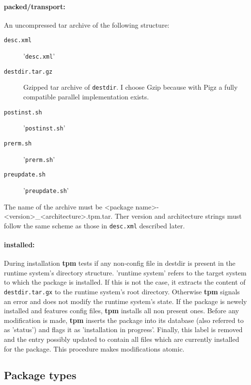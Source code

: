\documentclass[a4paper]{article}
\newcommand{\file}[1]{\texttt{#1}}
\newcommand{\program}[1]{\textbf{#1}}
\begin{document}
	\paragraph{packed/transport:}
	An uncompressed tar archive of the following structure:
	\begin{description}
		\item[\file{desc.xml}] '\file{desc.xml}'
		
		\item[\file{destdir.tar.gz}] Gzipped tar archive of \file{destdir}. I choose Gzip because with Pigz a fully compatible parallel implementation exists.
		
		\item[\file{postinst.sh}] '\file{postinst.sh}'
		
		\item[\file{prerm.sh}] '\file{prerm.sh}'
		
		\item[\file{preupdate.sh}] '\file{preupdate.sh}'
	\end{description}
	
	\noindent
	The name of the archive must be <package name>-<version>\_<architecture>.tpm.tar. Ther version and architecture strings must follow the same scheme as those in \file{desc.xml} described later.
	
	\paragraph{installed:}
	During installation \program{tpm} tests if any non-config file in destdir is present in the runtime system's directory structure. 'runtime system' refers to the target system to which the package is installed. If this is not the case, it extracts the content of \file{destdir.tar.gx} to the runtime system's root directory. Otherwise \program{tpm} signals an error and does not modify the runtime system's state. If the package is newely installed and features config files, \program{tpm} installs all non present ones. Before any modification is made, \program{tpm} inserts the package into its database (also referred to as 'status') and flags it as 'installation in progress'. Finally, this label is removed and the entry possibly updated to contain all files which are currently installed for the package. This procedure makes modifications atomic.
	
	\subsection{Package types}
	\label{sec:package_types}
	
\end{document}
